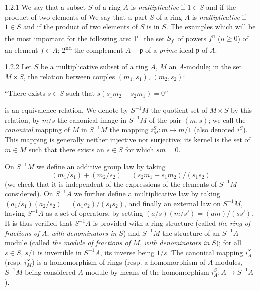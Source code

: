 
\begin{env}{1.2.1}
\label{env-0.1.2.1}
We say that a subset $S$ of a ring $A$ is \emph{multiplicative} if $1\in S$ and if the product of two elements of
We say that a part $S$ of a ring $A$ is \emph{multiplicative} if $1\in S$ and if the product of two elements of
$S$ is in $S$. The examples which will be the most important for the following are:
1\textsuperscript{st} the set $S_f$ of powers $f^n$ ($n\geq 0$) of an element $f\in A$;
2\textsuperscript{nd} the complement $A-\mathfrak{p}$ of a \emph{prime} ideal $\mathfrak{p}$ of $A$.
\end{env}

\begin{env}{1.2.2}
\label{env-0.1.2.2}
Let $S$ be a multiplicative subset of a ring $A$, $M$ an $A$-module; in the set $M\times S$, the relation between
couples $(m_1,s_1)$, $(m_2,s_2)$:
\begin{center}
   ``There exists $s\in S$ such that $s(s_1 m_2-s_2 m_1)=0$''
\end{center}
is an equivalence relation. We denote by $S^{-1}M$ the quotient set of $M\times S$ by this relation, by $m/s$ the canonical
image in $S^{-1}M$ of the pair $(m,s)$; we call the \emph{canonical} mapping of $M$ in $S^{-1}M$ the mapping $i_M^S\colon m\mapsto m/1$
(also denoted $i^S$). This mapping is generally neither injective nor surjective; its kernel is the set of $m\in M$ such that there
exists an $s\in S$ for which $sm=0$.

On $S^{-1}M$ we define an additive group law by taking
\[
  (m_1/s_1)+(m_2/s_2)=(s_2 m_1+s_1 m_2)/(s_1 s_2)
\]
(we check that it is independent of the expressions of the elements of $S^{-1}M$ considered). On $S^{-1}A$ we further define
a multiplicative law by taking $(a_1/s_1)(a_2/s_2)=(a_1 a_2)/(s_1 s_2)$, and finally an external law on $S^{-1}M$, having
$S^{-1}A$ as a set of operators, by setting $(a/s)(m/s')=(am)/(ss')$. It is thus verified that $S^{-1}A$ is provided with a
ring structure (called \emph{the ring of fractions of} $A$, \emph{with denominators in} $S$) and $S^{-1}M$ the structure of
an $S^{-1}A$-module (called \emph{the  module of fractions of} $M$, \emph{with denominators in} $S$); for all $s\in S$,
$s/1$ is invertible in $S^{-1}A$, its inverse being $1/s$. The canonical mapping $i_A^S$ (resp. $i_M^S$) is a homomorphism
of rings (resp. a homomorphism of $A$-modules, $S^{-1}M$ being considered $A$-module by means of the homomorphism
$i_A^S\colon A\to S^{-1}A$).
\end{env}

